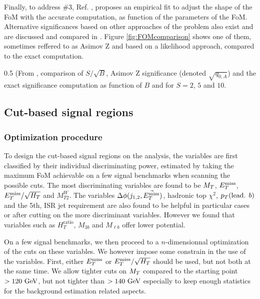     Finally, to address \#3, Ref. \cite{Punzi}, proposes an empirical fit to adjust the
    shape of the FoM with the accurate computation, as function of the parameters
    of the FoM. Alternative significances based on other approaches of the problem also
    exist and are discussed and compared in .
    Figure \ref{fig:FOMcomparison} shows one of them, sometimes reffered to as Asimov Z and based on a 
    likelihood approach, compared to the exact computation.

                 {0.5}
                 {(From , comparison of $S/\sqrt{B}$, 
                 Asimov Z significance (denoted $\sqrt{q_{0,A}}$) and the exact significance computation
                 as function of $B$ and for $S = 2$, $5$ and $10$.}

        \subsection{Cut-based signal regions}

            \subsubsection{Optimization procedure}

    To design the cut-based signal regions on the analysis, the variables are first 
    classified by their individual discriminating power, estimated by taking the 
    maximum FoM achievable on a few signal benchmarks when scanning the possible 
    cuts. The most discriminating variables are found to be $M_T$, $E_T^\text{miss}$, 
    $E_T^\text{miss}/\sqrt{H_T}$ and $M_{T2}^{W}$. The variables $\Delta \phi(j_{1,2},\vec{E_T^\text{miss}})$, 
    hadronic top $\chi^2$, $p_T(\text{lead. } b)$ and the 5th, ISR jet requirement are
    also found to be helpful in particular cases or after cutting on the more discriminant
    variables. However we found that variables such as $H_T^\text{ratio}$, $M_{3b}$ and
    $M_{\ell b}$ offer lower potential.

    On a few signal benchmarks, we then proceed to a $n$-dimensionnal optimization of the
    cuts on these variables. We however impose some constrain in the use of the variables.
    First, either $E_T^\text{miss}$ or $E_T^\text{miss}/\sqrt{H_T}$ should be used, but not both at the same time.
    We allow tighter cuts on $M_T$ compared to the starting point $> 120~\text{GeV}$, but not
    tighter than $> 140~\text{GeV}$ especially to keep enough statistics for the background
    estimation related aspects.

